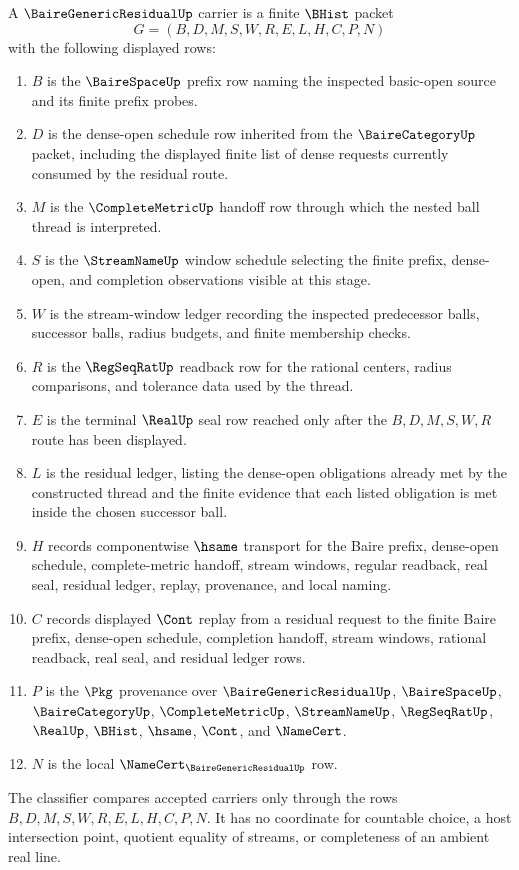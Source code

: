 \begin{definition}
\label{def:baire-generic-residual-carrier}
A $\BaireGenericResidualUp$ carrier is a finite $\BHist$ packet
$$
G=(B,D,M,S,W,R,E,L,H,C,P,N)
$$
with the following displayed rows:
\begin{enumerate}
\item $B$ is the $\BaireSpaceUp$ prefix row naming the inspected basic-open source and its finite prefix probes.
\item $D$ is the dense-open schedule row inherited from the $\BaireCategoryUp$ packet, including the displayed finite list of dense requests currently consumed by the residual route.
\item $M$ is the $\CompleteMetricUp$ handoff row through which the nested ball thread is interpreted.
\item $S$ is the $\StreamNameUp$ window schedule selecting the finite prefix, dense-open, and completion observations visible at this stage.
\item $W$ is the stream-window ledger recording the inspected predecessor balls, successor balls, radius budgets, and finite membership checks.
\item $R$ is the $\RegSeqRatUp$ readback row for the rational centers, radius comparisons, and tolerance data used by the thread.
\item $E$ is the terminal $\RealUp$ seal row reached only after the $B,D,M,S,W,R$ route has been displayed.
\item $L$ is the residual ledger, listing the dense-open obligations already met by the constructed thread and the finite evidence that each listed obligation is met inside the chosen successor ball.
\item $H$ records componentwise $\hsame$ transport for the Baire prefix, dense-open schedule, complete-metric handoff, stream windows, regular readback, real seal, residual ledger, replay, provenance, and local naming.
\item $C$ records displayed $\Cont$ replay from a residual request to the finite Baire prefix, dense-open schedule, completion handoff, stream windows, rational readback, real seal, and residual ledger rows.
\item $P$ is the $\Pkg$ provenance over $\BaireGenericResidualUp$, $\BaireSpaceUp$, $\BaireCategoryUp$, $\CompleteMetricUp$, $\StreamNameUp$, $\RegSeqRatUp$, $\RealUp$, $\BHist$, $\hsame$, $\Cont$, and $\NameCert$.
\item $N$ is the local $\NameCert_{\BaireGenericResidualUp}$ row.
\end{enumerate}
The classifier compares accepted carriers only through the rows $B,D,M,S,W,R,E,L,H,C,P,N$. It has no coordinate for countable choice, a host intersection point, quotient equality of streams, or completeness of an ambient real line.
\end{definition}


